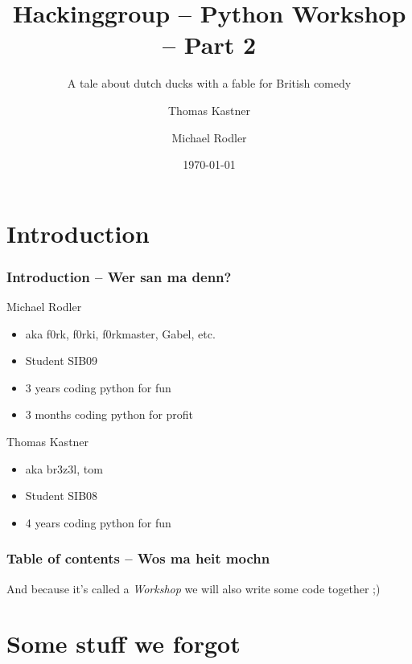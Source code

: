 \documentclass{beamer}
\title[Python Workshop]{Hackinggroup -- Python Workshop -- Part 2}
\subtitle{A tale about dutch ducks with a fable for British comedy}
\author[Thomas Kastner, Michael Rodler]{Thomas Kastner\and Michael Rodler}
\date{\today}
\begin{document}
\begin{frame}
    \titlepage
\end{frame}

\section*{Introduction}

\begin{frame}
    \frametitle{Introduction -- Wer san ma denn?}

    \begin{block}{Michael Rodler}
    \begin{itemize}
        \item aka f0rk, f0rki, f0rkmaster, Gabel, etc.
        \item Student SIB09
        \item 3 years coding python for fun
        \item 3 months coding python for profit
    \end{itemize}
    \end{block}

    \begin{block}{Thomas Kastner}
    \begin{itemize}
        \item aka br3z3l, tom
        \item Student SIB08
        \item 4 years coding python for fun
    \end{itemize}
    \end{block}
\end{frame}


\begin{frame}[fragile]
    \frametitle{Table of contents -- Wos ma heit mochn}
    \tableofcontents
\pause
    And because it's called a \emph{Workshop} we will also write some code together ;)
\end{frame}

\section{Some stuff we forgot}	%
\end{document}
